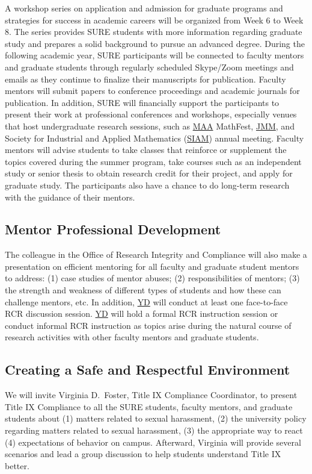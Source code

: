 \documentclass[11pt]{NSFamsart}
\newcommand{\YD}{\hyperlink{YDlink}{YD}\xspace}
\newcommand{\MAA}{\hyperlink{MAAlink}{MAA}\xspace}
\newcommand{\JMM}{\hyperlink{JMMlink}{JMM}\xspace}
\newcommand{\SIAM}{\hyperlink{SIAMlink}{SIAM}\xspace}
\begin{document}
A workshop series on application and admission for graduate programs and strategies for success in academic careers will be organized from Week 6 to Week 8. The series provides SURE students with more information regarding graduate study and prepares a solid background to pursue an advanced degree.  During the following academic year, SURE participants will be connected to faculty mentors and graduate students through regularly scheduled Skype/Zoom meetings and emails as they continue to finalize their manuscripts for publication. Faculty mentors will submit papers to conference proceedings and academic journals for publication. In addition, SURE will financially support the participants to present their work at professional conferences and workshops, especially venues that host undergraduate research sessions, such as \MAA MathFest, \JMM, and \hypertarget{SIAMlink}{Society for Industrial and Applied Mathematics} (\SIAM) annual meeting. Faculty mentors will advise students to take classes that reinforce or supplement the topics covered during the summer program, take courses such as an independent study or senior thesis to obtain research credit for their project, and apply for graduate study.
The participants also have a chance to do long-term research with the guidance of their mentors.

 \subsection{Mentor Professional Development}
The colleague in the Office of Research Integrity and Compliance will also make a presentation on efficient mentoring for all faculty and graduate student mentors to address: (1) case studies
of mentor abuses; (2) responsibilities of mentors; (3) the strength and weakness of different types of students and how these can challenge mentors, etc. In addition, \YD will conduct at least one face-to-face RCR discussion session. \YD will hold a formal RCR instruction session or conduct informal RCR instruction as topics arise during the natural course of research activities with other faculty mentors and graduate students. 





\subsection{Creating a Safe and Respectful Environment} 
We will invite Virginia D.\ Foster, Title IX Compliance Coordinator, to present Title IX Compliance to all the SURE students, faculty mentors, and graduate students about
(1) matters related to sexual harassment,
(2) the university policy regarding matters related to sexual harassment,
(3) the appropriate way to react
(4) expectations of behavior on campus. Afterward, Virginia will provide several scenarios and lead a group discussion to help students understand Title IX better. 
\end{document}
